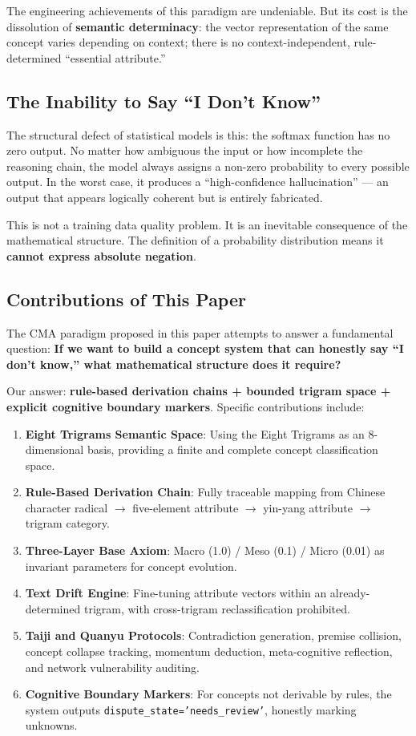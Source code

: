 \documentclass[11pt,a4paper]{article}
\begin{document}
The engineering achievements of this paradigm are undeniable. But its cost is the dissolution of \textbf{semantic determinacy}: the vector representation of the same concept varies depending on context; there is no context-independent, rule-determined ``essential attribute.''

\subsection{The Inability to Say ``I Don't Know''}

The structural defect of statistical models is this: the softmax function has no zero output. No matter how ambiguous the input or how incomplete the reasoning chain, the model always assigns a non-zero probability to every possible output. In the worst case, it produces a ``high-confidence hallucination'' — an output that appears logically coherent but is entirely fabricated.

This is not a training data quality problem. It is an inevitable consequence of the mathematical structure. The definition of a probability distribution means it \textbf{cannot express absolute negation}.

\subsection{Contributions of This Paper}

The CMA paradigm proposed in this paper attempts to answer a fundamental question: \textbf{If we want to build a concept system that can honestly say ``I don't know,'' what mathematical structure does it require?}

Our answer: \textbf{rule-based derivation chains + bounded trigram space + explicit cognitive boundary markers}. Specific contributions include:

\begin{enumerate}
    \item \textbf{Eight Trigrams Semantic Space}: Using the Eight Trigrams as an 8-dimensional basis, providing a finite and complete concept classification space.
    \item \textbf{Rule-Based Derivation Chain}: Fully traceable mapping from Chinese character radical $\rightarrow$ five-element attribute $\rightarrow$ yin-yang attribute $\rightarrow$ trigram category.
    \item \textbf{Three-Layer Base Axiom}: Macro (1.0) / Meso (0.1) / Micro (0.01) as invariant parameters for concept evolution.
    \item \textbf{Text Drift Engine}: Fine-tuning attribute vectors within an already-determined trigram, with cross-trigram reclassification prohibited.
    \item \textbf{Taiji and Quanyu Protocols}: Contradiction generation, premise collision, concept collapse tracking, momentum deduction, meta-cognitive reflection, and network vulnerability auditing.
    \item \textbf{Cognitive Boundary Markers}: For concepts not derivable by rules, the system outputs \texttt{dispute\_state='needs\_review'}, honestly marking unknowns.
\end{enumerate}
\end{document}
